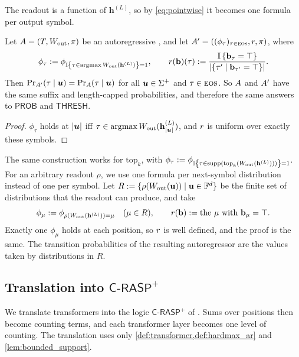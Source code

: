 The readout is a function of $\mathbf{h}^{(L)}$, so by \cref{eq:pointwise} it becomes one formula per output symbol.

\begin{corollary} \label{cor:hardmax_to_brasp_ar}
Let ${A}=({T},W_{\textnormal{out}},\pi)$ be an autoregressive \frtfr{}, and let
${A}'=((\phi_\tau)_{\tau\in{{\textsc{eos}}}},{r},\pi)$, where
\[
\phi_\tau := \phi_{\mathbb{I} \left\{ \tau\in\operatorname*{{{ argmax}}}W_{\textnormal{out}}(\mathbf{h}^{(L)}) \right\}=1},
\qquad
{r}(\mathbf{b})(\tau) := \frac{\mathbb{I} \left\{ \mathbf{b}_\tau=\top \right\}}{|\{\tau'\mid\mathbf{b}_{\tau'}=\top\}|}.
\]
Then ${\textnormal{Pr}_{{A}'}(\tau \mid {{\boldsymbol{u}}})}={\textnormal{Pr}_{{A}}(\tau \mid {{\boldsymbol{u}}})}$ for all ${{\boldsymbol{u}}}\in{{ \Sigma}}^+$ and $\tau\in{{\textsc{eos}}}$.
So ${A}$ and ${A}'$ have the same suffix and length-capped probabilities, and therefore
the same answers to $\mathsf{PROB}$ and $\mathsf{THRESH}$.
\end{corollary}

\begin{proof}
$\phi_\tau$ holds at $|{{\boldsymbol{u}}}|$ iff $\tau\in\operatorname*{{{ argmax}}}W_{\textnormal{out}}(\mathbf{h}^{(L)}_{|{{\boldsymbol{u}}}|})$, and ${r}$ is uniform over exactly these symbols.
\end{proof}

The same construction works for $\mathrm{top}_k$, with $\phi_\tau := \phi_{\mathbb{I} \left\{ \tau\in\mathrm{supp}(\mathrm{top}_k(W_{\textnormal{out}}(\mathbf{h}^{(L)}))) \right\}=1}$.
For an arbitrary readout $\rho$, we use one formula per next-symbol distribution instead of one per symbol.
Let $R:=\{\rho(W_{\textnormal{out}}(\mathbf{u}))\mid\mathbf{u}\in\mathbb{F}^d\}$ be the finite set of distributions that the readout can produce, and take
\[
\phi_\mu := \phi_{\rho(W_{\textnormal{out}}(\mathbf{h}^{(L)}))=\mu}\quad(\mu\in R),
\qquad
{r}(\mathbf{b}) := \text{the } \mu \text{ with } \mathbf{b}_\mu=\top.
\]
Exactly one $\phi_\mu$ holds at each position, so ${r}$ is well defined, and the proof is the same.
The transition probabilities of the resulting autoregressor are the values taken by distributions in $R$.
\subsection{Translation into \texorpdfstring{$\mathsf{C\text{-}RASP}^+$}{C-RASP+}}
\label{sec:transformer_to_crasp}

We translate transformers into the logic $\mathsf{C\text{-}RASP}^+$ of \citet{yang-etal-2025-length}.
Sums over positions then become counting terms, and each transformer layer becomes one level of counting.
The translation uses only \cref{def:transformer,def:hardmax_ar} and \cref{lem:bounded_support}.

